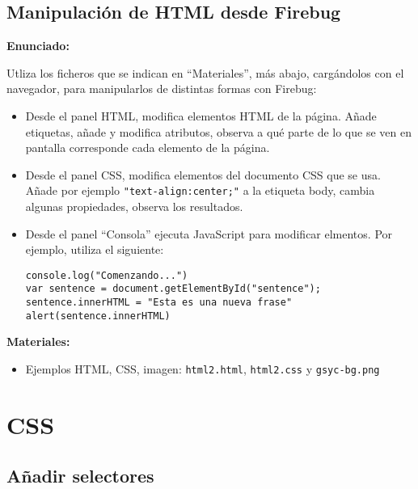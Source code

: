 \subsection{Manipulación de HTML desde Firebug}
\label{subsec:eje-html-firebug}

\textbf{Enunciado:}

Utliza los ficheros que se indican en ``Materiales'', más abajo, cargándolos con el navegador, para manipularlos de distintas formas con Firebug:

\begin{itemize}
\item Desde el panel HTML, modifica elementos HTML de la página. Añade etiquetas, añade y modifica atributos, observa a qué parte de lo que se ven en pantalla corresponde cada elemento de la página.
\item Desde el panel CSS, modifica elementos del documento CSS que se usa. Añade por ejemplo \verb|"text-align:center;"| a la etiqueta body, cambia algunas propiedades, observa los resultados.
\item Desde el panel ``Consola'' ejecuta JavaScript para modificar elmentos. Por ejemplo, utiliza el siguiente:

\begin{verbatim}
console.log("Comenzando...")
var sentence = document.getElementById("sentence");
sentence.innerHTML = "Esta es una nueva frase"
alert(sentence.innerHTML)
\end{verbatim}
\end{itemize}

\textbf{Materiales:}

\begin{itemize}
\item Ejemplos HTML, CSS, imagen:
 \verb|html2.html|, \verb|html2.css| y \verb|gsyc-bg.png|
\end{itemize}

\section{CSS}

\subsection{Añadir selectores}
\label{subsec:anadir-selectores}

